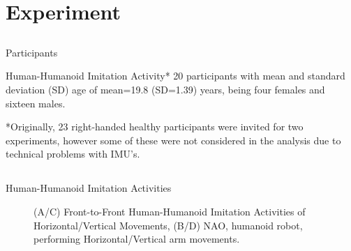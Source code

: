 \section{Experiment}

\subsection{}
{

\begin{frame}{Participants}


\begin{block}{Human-Humanoid Imitation Activity*}
20 participants with mean and standard deviation (SD) age of 
mean=19.8 (SD=1.39) years, being four females and sixteen males.
\end{block}

*Originally, 23 right-handed healthy participants were invited for 
two experiments, however some of these were not considered in the 
analysis due to technical problems with IMU's.


\end{frame}
}

%
%
%	
%

\subsection{}
{

\begin{frame}{Human-Humanoid Imitation Activities}
    \begin{figure}
	\caption[PA]{(A/C) Front-to-Front Human-Humanoid Imitation 
		Activities of Horizontal/Vertical Movements,
		(B/D) NAO, humanoid robot, performing 
		Horizontal/Vertical arm movements.
		}
   \end{figure}
	
\end{frame}
}


